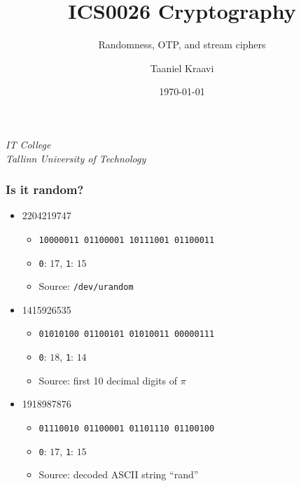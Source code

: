 \usepackage{crygame}
\usepackage{soul}

\usetikzlibrary{positioning,calc}

\graphicspath{ {../../images/} }

\title{ICS0026 Cryptography}
\subtitle{Randomness, OTP, and stream ciphers}
\date{\today}
\author{Taaniel Kraavi}
\institute%
{%
  \textit{IT College}\\
  \textit{Tallinn University of Technology}
}


\begin{frame}[plain]
  \titlepage
\end{frame}

\begin{frame}
  \frametitle{Is it random?}

  \begin{itemize}
    \item<1-> 2204219747
    \begin{itemize}
      \item<2-> \texttt{10000011 01100001 10111001 01100011}
      \item<2-> \texttt{0}: $17$, \texttt{1}: $15$
      \item<3-> Source: \texttt{/dev/urandom}
    \end{itemize}
    \item<1-> 1415926535
    \begin{itemize}
      \item<2-> \texttt{01010100 01100101 01010011 00000111}
      \item<2-> \texttt{0}: $18$, \texttt{1}: $14$
      \item<4-> Source: first 10 decimal digits of $\pi$
    \end{itemize}
    \item<1-> 1918987876
    \begin{itemize}
      \item<2-> \texttt{01110010 01100001 01101110 01100100}
      \item<2-> \texttt{0}: $17$, \texttt{1}: $15$
      \item<5-> Source: decoded ASCII string \enquote{rand}
    \end{itemize}
  \end{itemize}
\end{frame}

